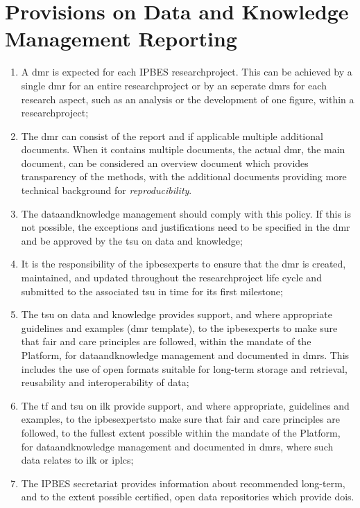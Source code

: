 \documentclass{article}
\begin{document}
\section{Provisions on Data and Knowledge Management Reporting}


\begin{enumerate}[label=(\alph*)]
    \item A \gls{dmr} is expected for each IPBES \gls{researchproject}. This can be achieved by a single \gls{dmr} for an entire \gls{researchproject} or by an seperate \glspl{dmr} for each \gls{research} aspect, such as an analysis or the development of one figure, within a \gls{researchproject};

    \item The \gls{dmr} can consist of the report and if applicable multiple additional documents. When it contains multiple documents, the actual \gls{dmr}, the main document, can be considered an overview document which provides transparency of the methods, with the additional documents providing more technical background for \textit{reproducibility}.

    \item The \gls{dataandknowledge} management should comply with this policy. If this is not possible, the exceptions and justifications need to be specified in the \gls{dmr} and be approved by the  \gls{tsu} on data and knowledge;

    \item It is the responsibility of the \glspl{ipbesexpert} to ensure that the \gls{dmr} is created, maintained, and updated throughout the \gls{researchproject} life cycle and submitted to the associated  \gls{tsu} in time for its first \gls{milestone};

    \item The  \gls{tsu} on \gls{data} and \gls{knowledge} provides support, and where appropriate guidelines and examples (\gls{dmr}  template), to the \glspl{ipbesexpert} to make sure that \gls{fair} and \gls{care} principles are followed, within the mandate of the Platform, for \gls{dataandknowledge} management and documented in \glspl{dmr}. This includes the use of open formats suitable for long-term storage and retrieval, reusability and interoperability of \gls{data};

    \item The \gls{tf} and \gls{tsu} on \gls{ilk} provide support, and where appropriate, guidelines and examples, to the \glspl{ipbesexpert}to make sure that \gls{fair} and \gls{care} principles are followed, to the fullest extent possible within the mandate of the Platform, for \gls{dataandknowledge} management and documented in \glspl{dmr}, where such \gls{data} relates to \gls{ilk} or \glspl{iplc};

    \item The IPBES \gls{secretariat} provides information about recommended long-term, and to the extent possible certified, open \gls{data} repositories which provide \glspl{doi}.
\end{enumerate}
\end{document}
